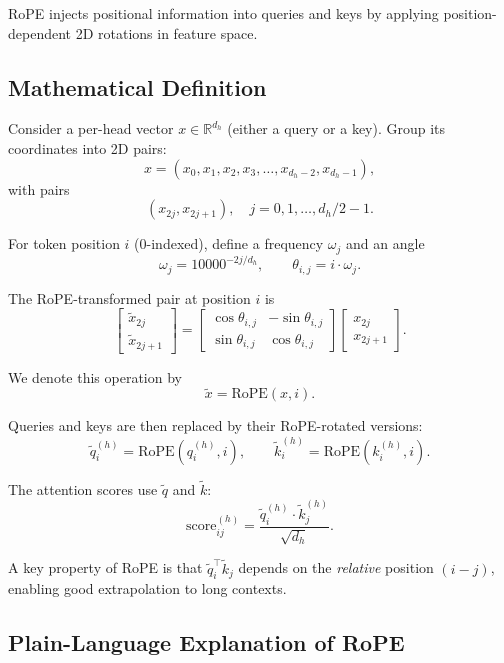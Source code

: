 \documentclass[11pt]{article}
\theoremstyle{remark}
\begin{document}
RoPE injects positional information into queries and keys by applying position-dependent 2D rotations in feature space.

\subsection{Mathematical Definition}

Consider a per-head vector $x \in \mathbb{R}^{d_h}$ (either a query or a key). Group its coordinates into 2D pairs:
\[
x =
(x_0, x_1, x_2, x_3, \dots, x_{d_h-2}, x_{d_h-1}),
\]
with pairs
\[
(x_{2j}, x_{2j+1}), \quad j = 0, 1, \dots, d_h/2 - 1.
\]

For token position $i$ (0-indexed), define a frequency $\omega_j$ and an angle
\[
\omega_j = 10000^{-2j/d_h}, \qquad
\theta_{i,j} = i \cdot \omega_j.
\]

The RoPE-transformed pair at position $i$ is
\[
\begin{bmatrix}
\tilde{x}_{2j} \\
\tilde{x}_{2j+1}
\end{bmatrix}
=
\begin{bmatrix}
\cos \theta_{i,j} & -\sin \theta_{i,j} \\
\sin \theta_{i,j} & \cos \theta_{i,j}
\end{bmatrix}
\begin{bmatrix}
x_{2j} \\
x_{2j+1}
\end{bmatrix}.
\]

We denote this operation by
\[
\tilde{x} = \text{RoPE}(x, i).
\]

Queries and keys are then replaced by their RoPE-rotated versions:
\[
\tilde{q}_i^{(h)} = \text{RoPE}(q_i^{(h)}, i), \qquad
\tilde{k}_i^{(h)} = \text{RoPE}(k_i^{(h)}, i).
\]

The attention scores use $\tilde{q}$ and $\tilde{k}$:
\[
\text{score}^{(h)}_{ij}
=
\frac{
\tilde{q}_i^{(h)} \cdot \tilde{k}_j^{(h)}
}{
\sqrt{d_h}
}.
\]

A key property of RoPE is that $\tilde{q}_i^{\top}\tilde{k}_j$ depends on the \emph{relative} position $(i - j)$, enabling good extrapolation to long contexts.

\subsection{Plain-Language Explanation of RoPE}
\end{document}
